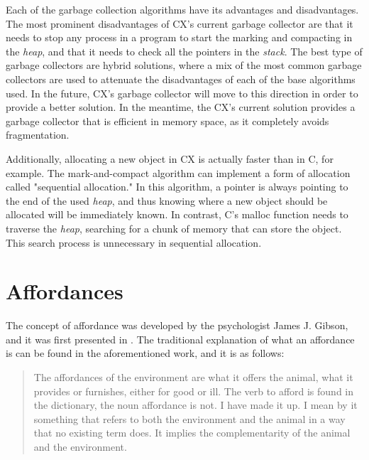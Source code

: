 \documentclass[11pt,fleqn,openany]{book} %
\begin{document}
Each of the garbage collection algorithms have its advantages and disadvantages. The most prominent disadvantages of CX's current garbage collector are that it needs to stop any process in a program to start the marking and compacting in the \emph{heap}, and that it needs to check all the pointers in the \emph{stack}. The best type of garbage collectors are hybrid solutions, where a mix of the most common garbage collectors are used to attenuate the disadvantages of each of the base algorithms used. In the future, CX's garbage collector will move to this direction in order to provide a better solution. In the meantime, the CX's current solution provides a garbage collector that is efficient in memory space, as it completely avoids fragmentation.

Additionally, allocating a new object in CX is actually faster than in C, for example. The mark-and-compact algorithm can implement a form of allocation called "sequential allocation." In this algorithm, a pointer is always pointing to the end of the used \emph{heap}, and thus knowing where a new object should be allocated will be immediately known. In contrast, C's malloc function needs to traverse the \emph{heap}, searching for a chunk of memory that can store the object. This search process is unnecessary in sequential allocation.




\chapter{Affordances}
\label{chapter:affordances}

The concept of affordance was developed by the psychologist James J. Gibson, and it was first presented in \cite{gibson1966senses}. The traditional explanation of what an affordance is can be found in the aforementioned work, and it is as follows:

\begin{quote}
The affordances of the environment are what it offers the animal, what it provides or furnishes, either for good or ill. The verb to afford is found in the dictionary, the noun affordance is not. I have made it up. I mean by it something that refers to both the environment and the animal in a way that no existing term does. It implies the complementarity of the animal and the environment.
\end{quote}
\end{document}
